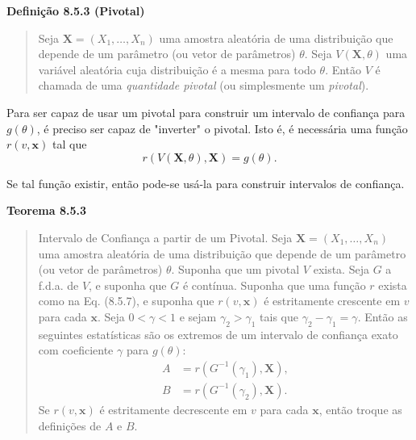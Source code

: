 \vspace{1em}
\noindent\textbf{Definição 8.5.3 (Pivotal)}
\begin{quote}
    Seja $\mathbf{X} = (X_1, \dots, X_n)$ uma amostra aleatória de uma distribuição que depende de um parâmetro (ou vetor de parâmetros) $\theta$. Seja $V(\mathbf{X}, \theta)$ uma variável aleatória cuja distribuição é a mesma para todo $\theta$. Então $V$ é chamada de uma \textit{quantidade pivotal} (ou simplesmente um \textit{pivotal}).
\end{quote}
\vspace{1em}

Para ser capaz de usar um pivotal para construir um intervalo de confiança para $g(\theta)$, é preciso ser capaz de "inverter" o pivotal. Isto é, é necessária uma função $r(v, \mathbf{x})$ tal que
\begin{equation} \label{eq:8.5.7}
    r(V(\mathbf{X}, \theta), \mathbf{X}) = g(\theta).
\end{equation}

Se tal função existir, então pode-se usá-la para construir intervalos de confiança.

\vspace{1em}
\noindent\textbf{Teorema 8.5.3}
\begin{quote}
    Intervalo de Confiança a partir de um Pivotal. Seja $\mathbf{X} = (X_1, \dots, X_n)$ uma amostra aleatória de uma distribuição que depende de um parâmetro (ou vetor de parâmetros) $\theta$. Suponha que um pivotal $V$ exista. Seja $G$ a f.d.a. de $V$, e suponha que $G$ é contínua. Suponha que uma função $r$ exista como na Eq. (8.5.7), e suponha que $r(v, \mathbf{x})$ é estritamente crescente em $v$ para cada $\mathbf{x}$. Seja $0 < \gamma < 1$ e sejam $\gamma_2 > \gamma_1$ tais que $\gamma_2 - \gamma_1 = \gamma$. Então as seguintes estatísticas são os extremos de um intervalo de confiança exato com coeficiente $\gamma$ para $g(\theta)$:
    \begin{align*}
        A &= r(G^{-1}(\gamma_1), \mathbf{X}), \\
        B &= r(G^{-1}(\gamma_2), \mathbf{X}).
    \end{align*}
    Se $r(v, \mathbf{x})$ é estritamente decrescente em $v$ para cada $\mathbf{x}$, então troque as definições de $A$ e $B$.
\end{quote}
\vspace{1em}

